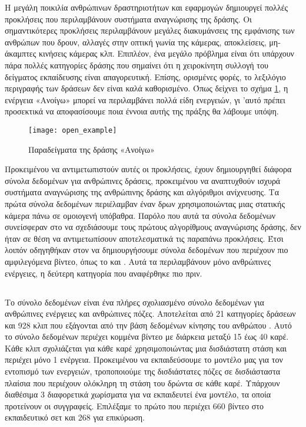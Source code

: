 Η μεγάλη ποικιλία ανθρώπινων δραστηριοτήτων και εφαρμογών δημιουργεί πολλές προκλήσεις που περιλαμβάνουν συστήματα αναγνώρισης της δράσης.
Οι σημαντικότερες προκλήσεις περιλαμβάνουν μεγάλες διακυμάνσεις της εμφάνισης των ανθρώπων που δρουν, αλλαγές στην οπτική γωνία της κάμερας, αποκλείσεις,
μη-άκαμπτες κινήσεις κάμερας κλπ. Επιπλέον, ένα μεγάλο πρόβλημα είναι ότι υπάρχουν πάρα πολλές κατηγορίες δράσης που σημαίνει
ότι η χειροκίνητη συλλογή του δείγματος εκπαίδευσης είναι απαγορευτική. Επίσης, ορισμένες φορές, το λεξιλόγιο περιγραφής των δράσεων δεν είναι καλά καθορισμένο.
Όπως δείχνει το σχήμα \ref{fig:open_example}, η ενέργεια «Ανοίγω» μπορεί να περιλαμβάνει πολλά είδη ενεργειών, γι 'αυτό πρέπει προσεκτικά
να αποφασίσουμε ποια έννοια αυτής της πράξης θα λάβουμε υπόψη.

\begin{figure}[h]
  \centering
  \texttt{[image: open\_example]}
  \caption{Παραδείγματα της δράσης «Ανοίγω»}
  \label{fig:open_example}

\end{figure}

Προκειμένου να αντιμετωπιστούν αυτές οι προκλήσεις, έχουν δημιουργηθεί διάφορα σύνολα δεδομένων για ανθρώπινες δράσεις, προκειμένου να αναπτυχθούν
ισχυρά συστήματα αναγνώρισης της ανθρώπινης δράσης και αλγόριθμοι ανίχνευσης.
Τα πρώτα σύνολα δεδομένων περιέλαμβαν έναν δρων χρησιμοποιώντας  μιας στατικής κάμερα πάνω σε ομοιογενή υπόβαθρα.
Παρόλο που αυτά τα σύνολα δεδομένων συνείσφεραν στο να σχεδιάσουμε τους πρώτους αλγορίθμους αναγνώρισης δράσης, δεν ήταν σε θέση να αντιμετωπίσουν αποτελεσματικά τις παραπάνω
προκλήσεις.
Έτσι λοιπόν οδηγηθήκαν στον να δημιουργήσουμε σύνολα δεδομένων που περιέχουν πιο αμφιλεγόμενα βίντεο, όπως το 
και . Αυτά τα  περιλαμβάνουν μόνο ανθρώπινες ενέργειες, η δεύτερη κατηγορία που αναφέρθηκε πιο πριν.

\subsection{}
Το σύνολο δεδομένων  είναι ένα πλήρες σχολιασμένο σύνολο δεδομένων για ανθρώπινες ενέργειες και ανθρώπινες πόζες. Αποτελείται από 21 κατηγορίες δράσεων
και 928 κλιπ που εξάγονται από την βάση δεδομένων κίνησης του ανθρώπου . Αυτό το σύνολο δεδομένων περιέχει κομμένα βίντεο με διάρκεια μεταξύ
15 έως 40 καρέ. Κάθε κλιπ σχολιάζεται για κάθε καρέ χρησιμοποιώντας μια δισδιάστατη στάση και περιέχει μόνο 1 ενέργεια.
Προκειμένου να εκπαιδεύσουμε το μοντέλο μας για τον εντοπισμό των ενεργειών, τροποποιούμε της δισδιάστατες πόζες σε δισδιάσταστα πλαίσια που περιέχουν ολόκληρη τη στάση του δρώντα σε κάθε καρέ.
Υπάρχουν διαθέσιμα 3 διαφορετικά χωρίσματα για να εκπαιδευτεί ένα μοντέλο, τα οποία προτείνουν οι συγγραφείς. Επιλέξαμε το πρώτο  που περιέχει 660
βίντεο στο εκπαιδευτικό σετ και 268 για επικύρωση.

